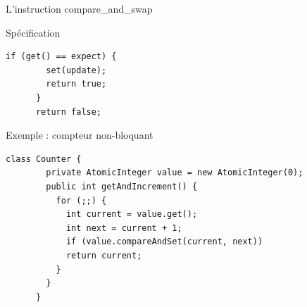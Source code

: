 
\begingroup

\begin{frame}[fragile]{L'instruction compare\_and\_swap}

  \begin{block}{Spécification}
    \vspace{3mm}
    \begin{lstlisting}[gobble=6]
      if (get() == expect) {
        set(update);
        return true;
      }
      return false;
    \end{lstlisting}
  \end{block}

  \begin{exampleblock}{Exemple : compteur non-bloquant}
    \begin{lstlisting}[gobble=6]
      class Counter {
        private AtomicInteger value = new AtomicInteger(0); 
        public int getAndIncrement() {
          for (;;) {
            int current = value.get();
            int next = current + 1;
            if (value.compareAndSet(current, next))
            return current;
          }
        }
      }
    \end{lstlisting}
  \end{exampleblock}


\end{frame}

\endgroup
\endinput
